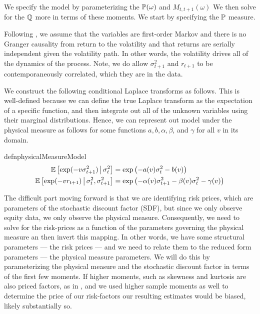 \documentclass[11pt, letterpaper, twoside, final]{article}
\begin{document}
We specify the model by parameterizing the $\mathbb{P}(\omega)$ and $M_{t, t+1}(\omega)$
We then solve for the $\mathbb{Q}$ more in terms of these moments.
We start by specifying the $\mathbb{P}$ measure.

Following \textcite{khrapov2016affine}, we assume that the variables are first-order Markov and there is no
Granger causality from return to the volatility and that returns are serially independent given the volatility
path.
In other words, the volatility drives all of the dynamics of the process.
Note, we do allow $\sigma^2_{t+1}$ and $r_{t+1}$ to be contemporaneously correlated, which they are in the data. 

We construct the following conditional Laplace transforms as follows.
This is well-defined because we can define the true Laplace transform as the expectation of a specific function,
and then integrate out all of the unknown variables using their marginal distributions.
Hence, we can represent out model under the physical measure as follows for some functions $a, b,
\alpha, \beta$, and $\gamma$ for all $v$ in its domain.


\begin{restatable}{defn}{physicalMeasureModel}
    \label{defn:physical_model}
    \begin{align}
        \operatorname{\mathbb{E}} \left[\exp(-v \sigma^2_{t+1}) \,\middle\vert\, \sigma^2_t \right] &= \exp\left( - a(v) 
        \sigma^2_t - b(v) \right) \\
        \operatorname{\mathbb{E}}\left[\exp(-v r_{t+1}) \,\middle\vert\, \sigma^2_t,  \sigma^2_{t+1}\right] &= \exp\left(- \alpha(v)
        \sigma^2_{t+1} - \beta(v)\sigma^2_t - \gamma(v) \right) 
    \end{align}
\end{restatable}


The difficult part moving forward is that we are identifying risk prices, which are  parameters of the stochastic
discount factor (SDF), but since we only observe equity data, we only observe the physical measure.
Consequently, we need to solve for the risk-prices as a function of the parameters governing the physical measure
an then invert this mapping.
In other words, we have some structural parameters --- the risk prices --- and we need to relate them to the
reduced form parameters --- the physical measure parameters.
We will do this by parameterizing the physical measure and the stochastic discount factor in terms of the first
few moments.
If higher moments, such as skewness and kurtosis are also priced factors, as in \textcites{harvey2000conditional,
conrad2012exante, chang2013market},  and we used higher sample moments as well to determine the price of our
risk-factors our resulting estimates would be biased, likely substantially so. 
\end{document}
